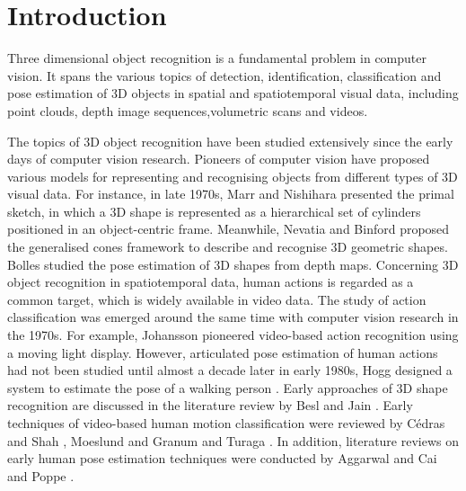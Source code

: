 \chapter{Introduction}
\label{chap/intro} 

Three dimensional object recognition is a fundamental problem in computer vision. It spans the various topics of detection, identification, classification and pose estimation of 3D objects in spatial and spatiotemporal visual data, including point clouds, depth image sequences,volumetric scans and videos.


The topics of 3D object recognition have been studied extensively since the early days of computer vision research. 
Pioneers of computer vision have proposed various models for representing and recognising objects from different types of 3D visual data.
For instance, in late 1970s, Marr and Nishihara \cite{Marr1978} presented the primal sketch, in which a 3D shape is represented as a hierarchical set of cylinders positioned in an object-centric frame. 
Meanwhile, Nevatia and Binford \cite{Nevatia1977} proposed the generalised cones framework to describe and recognise 3D geometric shapes. Bolles \etal \cite{Bolles1983} studied the pose estimation of 3D shapes from depth maps.  
Concerning 3D object recognition in spatiotemporal data, human actions is regarded as a common target, which is widely available in video data. The study of action classification was emerged around the same time with computer vision research in the 1970s. For example, Johansson \cite{Johansson1973} pioneered video-based action recognition using a moving light display. However, articulated pose estimation of human actions had not been studied until almost a decade later in early 1980s, \eg Hogg designed a system to estimate the pose of a walking person \cite{Hogg1983}. 
Early approaches of 3D shape recognition are discussed in the literature review by Besl and Jain \cite{Besl1985}. Early techniques of video-based human motion classification were reviewed by C\'edras and Shah \cite{Cedras1995}, Moeslund and Granum \cite{Moeslund2001} and Turaga \etal \cite{Turaga2008}. In addition, literature reviews on early human pose estimation techniques were conducted by Aggarwal and Cai \cite{Aggarwal1999} and Poppe \cite{Poppe2007}.  

